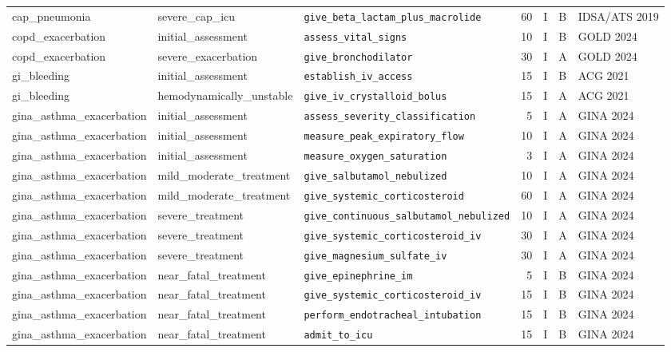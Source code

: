 \begin{longtable}{lllrrll}
cap\_pneumonia & severe\_cap\_icu & \texttt{give\_beta\_lactam\_plus\_macrolide} & 60 & I & B & IDSA/ATS 2019 \\
copd\_exacerbation & initial\_assessment & \texttt{assess\_vital\_signs} & 10 & I & B & GOLD 2024 \\
copd\_exacerbation & severe\_exacerbation & \texttt{give\_bronchodilator} & 30 & I & A & GOLD 2024 \\
gi\_bleeding & initial\_assessment & \texttt{establish\_iv\_access} & 15 & I & B & ACG 2021 \\
gi\_bleeding & hemodynamically\_unstable & \texttt{give\_iv\_crystalloid\_bolus} & 15 & I & A & ACG 2021 \\
gina\_asthma\_exacerbation & initial\_assessment & \texttt{assess\_severity\_classification} & 5 & I & A & GINA 2024 \\
gina\_asthma\_exacerbation & initial\_assessment & \texttt{measure\_peak\_expiratory\_flow} & 10 & I & A & GINA 2024 \\
gina\_asthma\_exacerbation & initial\_assessment & \texttt{measure\_oxygen\_saturation} & 3 & I & A & GINA 2024 \\
gina\_asthma\_exacerbation & mild\_moderate\_treatment & \texttt{give\_salbutamol\_nebulized} & 10 & I & A & GINA 2024 \\
gina\_asthma\_exacerbation & mild\_moderate\_treatment & \texttt{give\_systemic\_corticosteroid} & 60 & I & A & GINA 2024 \\
gina\_asthma\_exacerbation & severe\_treatment & \texttt{give\_continuous\_salbutamol\_nebulized} & 10 & I & A & GINA 2024 \\
gina\_asthma\_exacerbation & severe\_treatment & \texttt{give\_systemic\_corticosteroid\_iv} & 30 & I & A & GINA 2024 \\
gina\_asthma\_exacerbation & severe\_treatment & \texttt{give\_magnesium\_sulfate\_iv} & 30 & I & A & GINA 2024 \\
gina\_asthma\_exacerbation & near\_fatal\_treatment & \texttt{give\_epinephrine\_im} & 5 & I & B & GINA 2024 \\
gina\_asthma\_exacerbation & near\_fatal\_treatment & \texttt{give\_systemic\_corticosteroid\_iv} & 15 & I & B & GINA 2024 \\
gina\_asthma\_exacerbation & near\_fatal\_treatment & \texttt{perform\_endotracheal\_intubation} & 15 & I & B & GINA 2024 \\
gina\_asthma\_exacerbation & near\_fatal\_treatment & \texttt{admit\_to\_icu} & 15 & I & B & GINA 2024 \\

\end{longtable}
